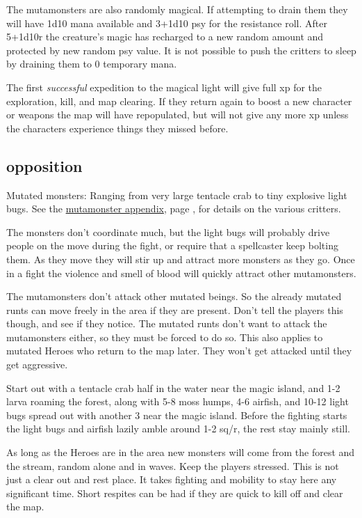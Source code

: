 The mutamonsters are also randomly magical. If attempting to drain them they will have 1d10 mana available and 3+1d10 psy for the resistance roll. After 5+1d10r the creature's magic has recharged to a new random amount and protected by new random psy value. It is not possible to push the critters to sleep by draining them to 0 temporary mana.

The first \emph{successful} expedition to the magical light will give full xp for the exploration, kill, and map clearing. If they return again to boost a new character or weapons the map will have repopulated, but will not give any more xp unless the characters experience things they missed before.


\subsection*{opposition}
Mutated monsters: Ranging from very large tentacle crab to tiny explosive light bugs. See the \hyperref[appendixmutamonsters]{mutamonster appendix}, page \pageref{appendixmutamonsters}, for details on the various critters.

The monsters don't coordinate much, but the light bugs will probably drive people on the move during the fight, or require that a spellcaster keep bolting them. As they move they will stir up and attract more monsters as they go. Once in a fight the violence and smell of blood will quickly attract other mutamonsters.

The mutamonsters don't attack other mutated beings. So the already mutated runts can move freely in the area if they are present. Don't tell the players this though, and see if they notice. The mutated runts don't want to attack the mutamonsters either, so they must be forced to do so. This also applies to mutated Heroes who return to the map later. They won't get attacked until they get aggressive.

Start out with a tentacle crab half in the water near the magic island, and 1-2 larva roaming the forest, along with 5-8 moss humps, 4-6 airfish, and 10-12 light bugs spread out with another 3 near the magic island.
Before the fighting starts the light bugs and airfish lazily amble around 1-2 sq/r, the rest stay mainly still.

As long as the Heroes are in the area new monsters will come from the forest and the stream, random alone and in waves. Keep the players stressed. This is not just a clear out and rest place. It takes fighting and mobility to stay here any significant time. Short respites can be had if they are quick to kill off and clear the map.


